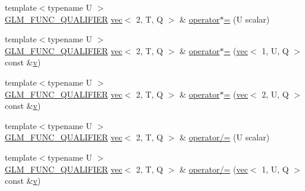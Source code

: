 \begin{DoxyCompactItemize}
\item 
{\footnotesize template$<$typename U $>$ }\\\mbox{\hyperlink{setup_8hpp_a33fdea6f91c5f834105f7415e2a64407}{G\+L\+M\+\_\+\+F\+U\+N\+C\+\_\+\+Q\+U\+A\+L\+I\+F\+I\+ER}} \mbox{\hyperlink{structglm_1_1vec}{vec}}$<$ 2, T, Q $>$ \& \mbox{\hyperlink{structglm_1_1vec_3_012_00_01_t_00_01_q_01_4_ad360d1fd9201d64bc34e5357e59d69ec}{operator$\ast$=}} (U scalar)
\item 
{\footnotesize template$<$typename U $>$ }\\\mbox{\hyperlink{setup_8hpp_a33fdea6f91c5f834105f7415e2a64407}{G\+L\+M\+\_\+\+F\+U\+N\+C\+\_\+\+Q\+U\+A\+L\+I\+F\+I\+ER}} \mbox{\hyperlink{structglm_1_1vec}{vec}}$<$ 2, T, Q $>$ \& \mbox{\hyperlink{structglm_1_1vec_3_012_00_01_t_00_01_q_01_4_ab1148ae3c3b8be0f46dd17ba8447ee55}{operator$\ast$=}} (\mbox{\hyperlink{structglm_1_1vec}{vec}}$<$ 1, U, Q $>$ const \&\mbox{\hyperlink{_s_d_l__opengl_8h_a10a82eabcb59d2fcd74acee063775f90}{v}})
\item 
{\footnotesize template$<$typename U $>$ }\\\mbox{\hyperlink{setup_8hpp_a33fdea6f91c5f834105f7415e2a64407}{G\+L\+M\+\_\+\+F\+U\+N\+C\+\_\+\+Q\+U\+A\+L\+I\+F\+I\+ER}} \mbox{\hyperlink{structglm_1_1vec}{vec}}$<$ 2, T, Q $>$ \& \mbox{\hyperlink{structglm_1_1vec_3_012_00_01_t_00_01_q_01_4_a4f386a696770fd88224391b4d41f14e3}{operator$\ast$=}} (\mbox{\hyperlink{structglm_1_1vec}{vec}}$<$ 2, U, Q $>$ const \&\mbox{\hyperlink{_s_d_l__opengl_8h_a10a82eabcb59d2fcd74acee063775f90}{v}})
\item 
{\footnotesize template$<$typename U $>$ }\\\mbox{\hyperlink{setup_8hpp_a33fdea6f91c5f834105f7415e2a64407}{G\+L\+M\+\_\+\+F\+U\+N\+C\+\_\+\+Q\+U\+A\+L\+I\+F\+I\+ER}} \mbox{\hyperlink{structglm_1_1vec}{vec}}$<$ 2, T, Q $>$ \& \mbox{\hyperlink{structglm_1_1vec_3_012_00_01_t_00_01_q_01_4_aa079256ad1b556250e46558103a984e8}{operator/=}} (U scalar)
\item 
{\footnotesize template$<$typename U $>$ }\\\mbox{\hyperlink{setup_8hpp_a33fdea6f91c5f834105f7415e2a64407}{G\+L\+M\+\_\+\+F\+U\+N\+C\+\_\+\+Q\+U\+A\+L\+I\+F\+I\+ER}} \mbox{\hyperlink{structglm_1_1vec}{vec}}$<$ 2, T, Q $>$ \& \mbox{\hyperlink{structglm_1_1vec_3_012_00_01_t_00_01_q_01_4_a686a525ae543252f200caac18da57c58}{operator/=}} (\mbox{\hyperlink{structglm_1_1vec}{vec}}$<$ 1, U, Q $>$ const \&\mbox{\hyperlink{_s_d_l__opengl_8h_a10a82eabcb59d2fcd74acee063775f90}{v}})
\item 

\end{DoxyCompactItemize}
